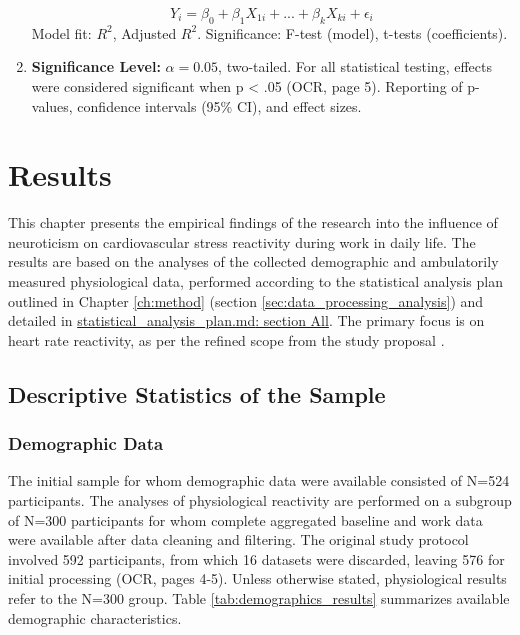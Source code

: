 \documentclass[11pt, a4paper]{report}
\newcommand{\mdcitesec}[2]{\href{run:./sources/#1}{\url{#1}: section #2}}
\begin{document}
\begin{enumerate}
        \begin{equation}
            Y_i = \beta_0 + \beta_1 X_{1i} + ... + \beta_k X_{ki} + \epsilon_i
        \end{equation}
        Model fit: $R^2$, Adjusted $R^2$. Significance: F-test (model), t-tests (coefficients).
    \item \textbf{Significance Level:} $\alpha = 0.05$, two-tailed. For all statistical testing, effects were considered significant when p < .05 \cite{ThesisTempPDF} (OCR, page 5). Reporting of p-values, confidence intervals (95\% CI), and effect sizes.
\end{enumerate}

\chapter{Results}
\label{ch:results}

This chapter presents the empirical findings of the research into the influence of neuroticism on cardiovascular stress reactivity during work in daily life. The results are based on the analyses of the collected demographic and ambulatorily measured physiological data, performed according to the statistical analysis plan outlined in Chapter \ref{ch:method} (section \ref{sec:data_processing_analysis}) and detailed in \mdcitesec{statistical_analysis_plan.md}{All}. The primary focus is on heart rate reactivity, as per the refined scope from the study proposal \cite{ThesisTempPDF}.

\section{Descriptive Statistics of the Sample}
\label{sec:results_descriptives_sample} %

\subsection{Demographic Data}
\label{subsec:results_demographics_sample} %
The initial sample for whom demographic data were available consisted of N=524 participants. The analyses of physiological reactivity are performed on a subgroup of N=300 participants for whom complete aggregated baseline and work data were available after data cleaning and filtering. The original study protocol involved 592 participants, from which 16 datasets were discarded, leaving 576 for initial processing \cite{ThesisTempPDF} (OCR, pages 4-5). Unless otherwise stated, physiological results refer to the N=300 group. Table \ref{tab:demographics_results} summarizes available demographic characteristics.
\end{document}
